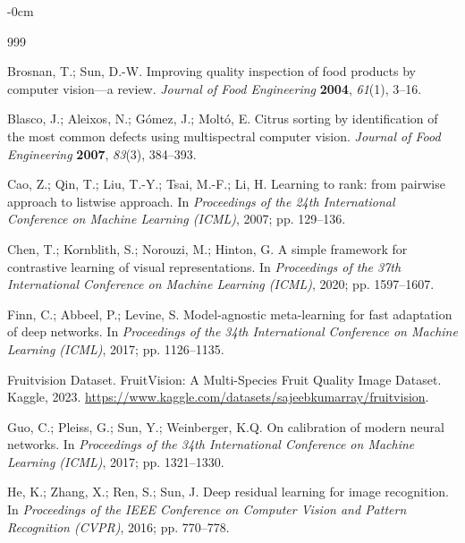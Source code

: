 \documentclass[preprint,12pt,authoryear]{elsarticle}
\begin{document}
\begin{adjustwidth}{-\extralength}{0cm}

\begin{thebibliography}{999}

Brosnan, T.; Sun, D.-W.
\newblock Improving quality inspection of food products by computer vision---a
  review.
\newblock \emph{Journal of Food Engineering} \textbf{2004}, \emph{61}(1), 3--16.

Blasco, J.; Aleixos, N.; G\'{o}mez, J.; Molt\'{o}, E.
\newblock Citrus sorting by identification of the most common defects using
  multispectral computer vision.
\newblock \emph{Journal of Food Engineering} \textbf{2007}, \emph{83}(3), 384--393.

Cao, Z.; Qin, T.; Liu, T.-Y.; Tsai, M.-F.; Li, H.
\newblock Learning to rank: from pairwise approach to listwise approach.
\newblock In \emph{Proceedings of the 24th International Conference on Machine
  Learning (ICML)}, 2007; pp. 129--136.

Chen, T.; Kornblith, S.; Norouzi, M.; Hinton, G.
\newblock A simple framework for contrastive learning of visual representations.
\newblock In \emph{Proceedings of the 37th International Conference on Machine
  Learning (ICML)}, 2020; pp. 1597--1607.

Finn, C.; Abbeel, P.; Levine, S.
\newblock Model-agnostic meta-learning for fast adaptation of deep networks.
\newblock In \emph{Proceedings of the 34th International Conference on Machine
  Learning (ICML)}, 2017; pp. 1126--1135.

Fruitvision Dataset.
\newblock FruitVision: A Multi-Species Fruit Quality Image Dataset.
\newblock Kaggle, 2023.
  \url{https://www.kaggle.com/datasets/sajeebkumarray/fruitvision}.

Guo, C.; Pleiss, G.; Sun, Y.; Weinberger, K.Q.
\newblock On calibration of modern neural networks.
\newblock In \emph{Proceedings of the 34th International Conference on Machine
  Learning (ICML)}, 2017; pp. 1321--1330.

He, K.; Zhang, X.; Ren, S.; Sun, J.
\newblock Deep residual learning for image recognition.
\newblock In \emph{Proceedings of the IEEE Conference on Computer Vision and
  Pattern Recognition (CVPR)}, 2016; pp. 770--778.


\end{thebibliography}
\end{adjustwidth}
\end{document}
